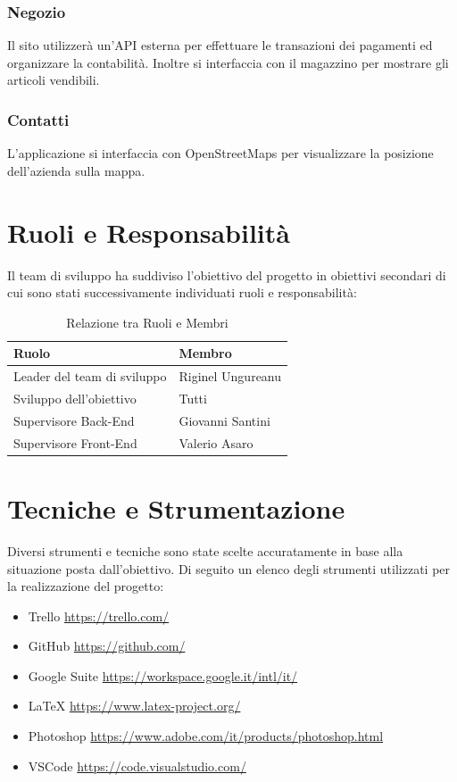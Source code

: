 \documentclass{report}
\begin{document}
\subsection*{Negozio}
Il sito utilizzerà un’API esterna per effettuare le transazioni dei pagamenti ed organizzare la contabilità. Inoltre si interfaccia con il magazzino per mostrare gli articoli vendibili.


\subsection*{Contatti}
L'applicazione si interfaccia con OpenStreetMaps per visualizzare la posizione dell’azienda sulla mappa.


\chapter{Ruoli e Responsabilità}
Il team di sviluppo ha suddiviso l’obiettivo del progetto in obiettivi secondari di cui sono stati successivamente individuati ruoli e responsabilità:

\begin{table}[!ht]
	\begin{center} %
		\centering
		\begin{tabular}{ |p{4cm}|p{4cm}|  }
			\hline
			\centering Ruolo & \qquad\qquad Membro \\ %
			\hline
			Leader del team di sviluppo & Riginel Ungureanu \\
			\hline
			Sviluppo dell'obiettivo & Tutti \\
			\hline
			Supervisore Back-End &
			Giovanni Santini \\
			\hline
			Supervisore Front-End & Valerio Asaro\\
			\hline
		\end{tabular}
		\caption{Relazione tra Ruoli e Membri}
	\end{center}
\end{table}


\chapter{Tecniche e Strumentazione}
Diversi strumenti e tecniche sono state scelte accuratamente in base alla situazione posta dall’obiettivo. Di seguito un elenco degli strumenti utilizzati per la realizzazione del progetto:

\begin{itemize}
	\item Trello \qquad \url{https://trello.com/}
	\item GitHub \qquad \url{https://github.com/}
	\item Google Suite \qquad \url{https://workspace.google.it/intl/it/}
	\item LaTeX \qquad \url{https://www.latex-project.org/}
	\item Photoshop \qquad \url{https://www.adobe.com/it/products/photoshop.html}
	\item VSCode \qquad \url{https://code.visualstudio.com/}
\end{itemize}
\end{document}
